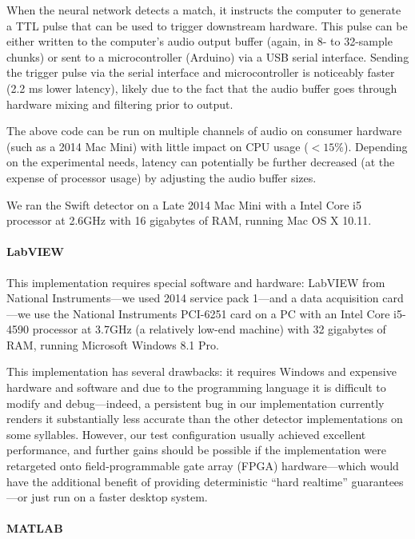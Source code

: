 \documentclass[10pt,letterpaper]{article}
\renewcommand{\subsubsection}[1]{\paragraph{#1}}
\begin{document}
When the neural network detects a match, it instructs the computer to
generate a TTL pulse that can be used to trigger downstream hardware.
This pulse can be either written to the computer's audio output buffer
(again, in 8- to 32-sample chunks) or sent to a microcontroller
(Arduino) via a USB serial interface. Sending the trigger pulse via
the serial interface and microcontroller is noticeably faster (2.2 ms
lower latency), likely due to the fact that the audio buffer goes
through hardware mixing and filtering prior to output.

The above code can be run on multiple channels of audio on consumer
hardware (such as a 2014 Mac Mini) with little impact on CPU usage
($<15\%$). Depending on the experimental needs, latency can potentially
be further decreased (at the expense of processor usage) by adjusting the audio
buffer sizes.

We ran the Swift detector on a Late 2014 Mac Mini with a Intel Core i5
processor at 2.6GHz  with 16 gigabytes of RAM, running Mac OS X 10.11.

\subsubsection{LabVIEW}

This implementation requires special software and hardware: LabVIEW
from National Instruments---we used 2014 service pack 1---and a data acquisition card---we use the
National Instruments PCI-6251 card on a PC with an Intel Core i5-4590
processor at 3.7GHz (a relatively low-end machine) with 32 gigabytes
of RAM, running Microsoft Windows 8.1 Pro.

This implementation has several drawbacks: it requires Windows and
expensive hardware and software and due to the programming language it
is difficult to modify and debug---indeed, a persistent bug in our
implementation currently renders it substantially less accurate than
the other detector implementations on some syllables. However, our
test configuration usually achieved excellent performance, and further
gains should be possible if the implementation were retargeted onto
field-programmable gate array (FPGA) hardware---which would have the additional benefit of providing
deterministic ``hard realtime'' guarantees---or just run on a faster
desktop system.

\subsubsection{MATLAB}
\end{document}
